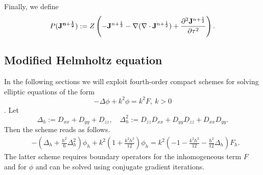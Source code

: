 \documentclass[12pt,reqno]{amsart}
\theoremstyle{definition}
\numberwithin{equation}{section}
\begin{document}


	
	Finally, we define 
	$$
	P({\bf J^{n+\frac{1}{2}}}):=Z\left ( -{\bf J}^{n+\frac{1}{2}}-\nabla (\nabla \cdot{\bf J}^{n+\frac{1}{2}})+\frac{\partial^2{\bf J}^{n+\frac{1}{2}}}{\partial \tau^2}\right ).
	$$
   \subsection{Modified Helmholtz equation}
   In the following sections we will exploit fourth-order compact schemes for solving elliptic equations of the form $$-\Delta \phi+k^2\phi=k^2F, \ k>0$$ \cite{singer_turkel}.
Let 
$$
\Delta_h:=D_{xx}+D_{yy}+D_{zz}, \quad \Delta^2_h:= D_{zz}D_{xx}+D_{yy}D_{zz}+D_{xx}D_{yy}.
$$
Then the scheme reads as follows.
\begin{align*}
	&
	-\left (
	\Delta_h+\frac{h^2}{6}\Delta^2_h
	\right)\phi_h+
	k^2\left (
	1+\frac{k^2h^2}{12}
	\right)\phi_h=
	k^2\left (
	-1-\frac{k^2h^2}{12}
	-\frac{h^2}{12}\Delta_h
	\right)F_h.
\end{align*}
The latter scheme requires boundary operators for the inhomogeneous term $F$ and for $\phi$ and can be solved using conjugate gradient iterations.
\end{document}
